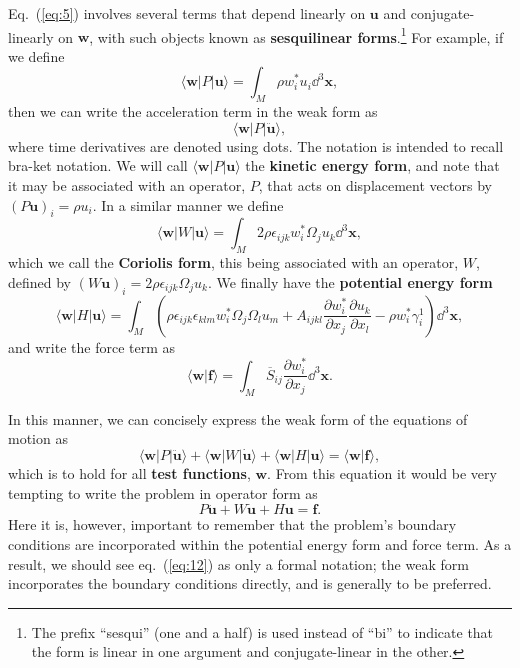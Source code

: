 Eq.~(\ref{eq:5}) involves several terms that depend linearly on $\mathbf{u}$ and conjugate-linearly on $\mathbf{w}$, with such objects known as 
 \textbf{sesquilinear forms}.\footnote{The prefix ``sesqui'' (one and a half) is used instead of ``bi'' to indicate that the form is linear in one argument and 
conjugate-linear in the other.} For example, if we define
\begin{equation}
\langle \mathbf{w}|P|\mathbf{u}\rangle=\int_{M}\rho w_{i}^{*}u_{i}\dd^{3}\mathbf{x},
\label{eq:6}
\end{equation}
then we can write the acceleration term in the weak form as
\begin{equation}
\langle \mathbf{w}|P|\ddot{\mathbf{u}}\rangle,
\label{eq:7}
\end{equation}
where time derivatives are denoted using dots. The notation is intended to recall bra-ket notation. We will 
call $\langle \mathbf{w}|P|\mathbf{u}\rangle$ the \textbf{kinetic energy form}, and note that it may be associated with an operator, $P$, 
that acts on displacement vectors by $(P\mathbf{u})_{i}=\rho u_{i}$. In a similar manner we define
\begin{equation}
\langle \mathbf{w}|W|\mathbf{u}\rangle=\int_{M}2\rho\epsilon_{ijk}w_{i}^{*}\Omega_{j}u_{k}\dd^{3}\mathbf{x},
\label{eq:8}
\end{equation}
which we call the \textbf{Coriolis form}, this being associated with an operator, $W$, defined by $(W\mathbf{u})_{i}=2\rho\epsilon_{ijk}\Omega_{j}u_{k}$.
We finally have the \textbf{potential energy form}
\begin{equation}
\langle \mathbf{w}|H|\mathbf{u}\rangle=\int_{M}\left(\rho\epsilon_{ijk}\epsilon_{klm}w_{i}^{*}\Omega_{j}\Omega_{l}u_{m}+A_{ijkl}\frac{\partial w_{i}^{*}}{\partial x_{j}}\frac{\partial u_{k}}{\partial x_{l}}-\rho w_{i}^{*}\gamma_{i}^{1}\right)\dd^{3}\mathbf{x},
\label{eq:9}
\end{equation}
and write the force term as
\begin{equation}
\langle \mathbf{w}|\mathbf{f}\rangle=\int_{M}\overline{S}_{ij}\frac{\partial w_{i}^{*}}{\partial x_{j}}\dd^{3}\mathbf{x}.
\label{eq:10}
\end{equation}

In this manner, we can concisely express the weak form of the equations of motion as
\begin{equation}
\langle \mathbf{w}|P|\ddot{\mathbf{u}}\rangle+\langle \mathbf{w}|W|\dot{\mathbf{u}}\rangle+\langle \mathbf{w}|H|\mathbf{u}\rangle=\langle \mathbf{w}|\mathbf{f}\rangle,
\label{eq:11}
\end{equation}
which is to hold for all \textbf{test functions}, $\mathbf{w}$. From this equation it would be very tempting to write the problem in operator form as
\begin{equation}
P\ddot{\mathbf{u}}+W\dot{\mathbf{u}}+H\mathbf{u}=\mathbf{f}.
\label{eq:12}
\end{equation}
Here it is, however, important to remember that the problem's boundary conditions are incorporated within the potential energy form and force term. As a result, we should see eq.~(\ref{eq:12}) as only a formal notation; the weak form incorporates the boundary conditions directly, and is generally to be preferred.

